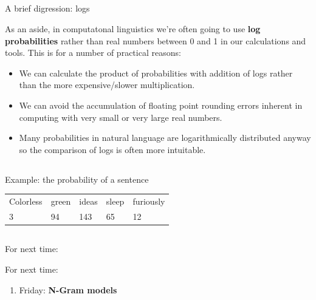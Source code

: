 \documentclass[9pt,xcolor=pdftex,dvipsnames,table]{beamer}
\begin{document}
\subsection{}
\begin{frame}{A brief digression: logs}

{\large As an aside, in computatonal linguistics we're often going to use \textbf{log probabilities} rather than real numbers between 0 and 1 in our calculations and tools.  This is for a number of practical reasons:}
\vspace{.5cm}

\begin{itemize}
	\item We can calculate the product of probabilities with addition of logs rather than the more expensive/slower multiplication.
	\item We can avoid the accumulation of floating point rounding errors inherent in computing with very small or very large real numbers.
	\item Many probabilities in natural language are logarithmically distributed anyway so the comparison of logs is often more intuitable.
\end{itemize}
\end{frame}

\subsection{}
\begin{frame}{Example: the probability of a sentence}

\begin{center}
\begin{tabular}{ l l l l l }
	          Colorless & green & ideas & sleep & furiously\\
              3 & 94 & 143 & 65 & 12 \\
\end{tabular}
\end{center}


\vspace{.5cm}

\end{frame}

\subsection{}
\begin{frame}{For next time:}

     \begin{block}{For next time:}
          \begin{enumerate}
          \item Friday: \textbf{N-Gram models}
          \end{enumerate}
     \end{block}
\end{frame}
\end{document}
